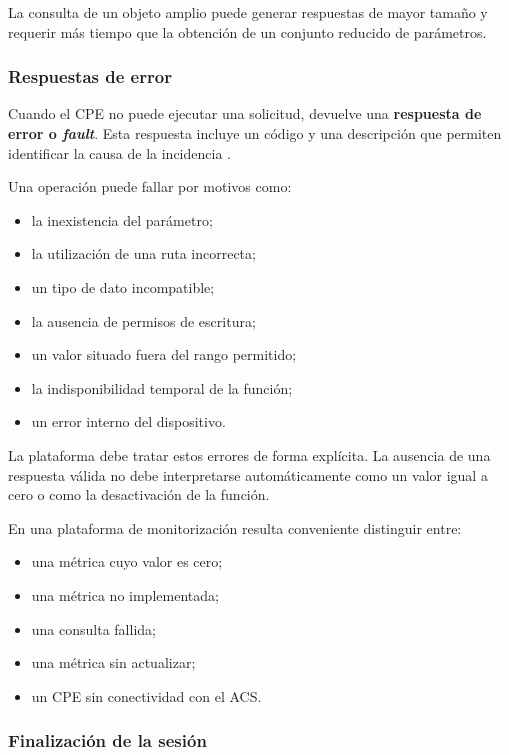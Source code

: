 La consulta de un objeto amplio puede generar respuestas de mayor tamaño
y requerir más tiempo que la obtención de un conjunto reducido de
parámetros.


\subsubsection*{Respuestas de error}

Cuando el CPE no puede ejecutar una solicitud, devuelve una
\textbf{respuesta de error o \textit{fault}}. Esta respuesta incluye un
código y una descripción que permiten identificar la causa de la
incidencia \cite{bbf_tr069}.

Una operación puede fallar por motivos como:

\begin{itemize}
    \item la inexistencia del parámetro;
    \item la utilización de una ruta incorrecta;
    \item un tipo de dato incompatible;
    \item la ausencia de permisos de escritura;
    \item un valor situado fuera del rango permitido;
    \item la indisponibilidad temporal de la función;
    \item un error interno del dispositivo.
\end{itemize}

La plataforma debe tratar estos errores de forma explícita. La ausencia
de una respuesta válida no debe interpretarse automáticamente como un
valor igual a cero o como la desactivación de la función.

En una plataforma de monitorización resulta conveniente distinguir entre:

\begin{itemize}
    \item una métrica cuyo valor es cero;
    \item una métrica no implementada;
    \item una consulta fallida;
    \item una métrica sin actualizar;
    \item un CPE sin conectividad con el ACS.
\end{itemize}


\subsubsection*{Finalización de la sesión}

